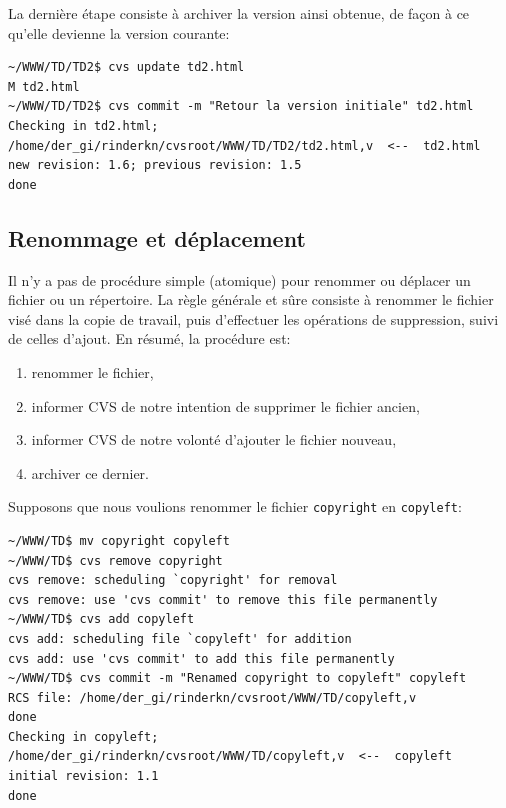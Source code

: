 \documentclass[11pt,a4paper]{article}
\begin{document}
\noindent La dernière étape consiste à archiver la version ainsi
obtenue, de façon à ce qu'elle devienne la version courante:

{\small
\begin{verbatim}
~/WWW/TD/TD2$ cvs update td2.html
M td2.html
~/WWW/TD/TD2$ cvs commit -m "Retour la version initiale" td2.html
Checking in td2.html;
/home/der_gi/rinderkn/cvsroot/WWW/TD/TD2/td2.html,v  <--  td2.html
new revision: 1.6; previous revision: 1.5
done

\end{verbatim}
}

\subsection{Renommage et déplacement}

Il n'y a pas de procédure simple (atomique) pour renommer ou déplacer
un fichier ou un répertoire. La règle générale et sûre consiste à
renommer le fichier visé dans la copie de travail, puis d'effectuer
les opérations de suppression, suivi de celles d'ajout. En résumé, la
procédure est:

\begin{enumerate}

  \item renommer le fichier,

  \item informer CVS de notre intention de supprimer le fichier
  ancien,

  \item informer CVS de notre volonté d'ajouter le fichier nouveau,

  \item archiver ce dernier.

\end{enumerate}

\noindent Supposons que nous voulions renommer le fichier
\texttt{copyright} en \texttt{copyleft}:

{\small
\begin{verbatim}
~/WWW/TD$ mv copyright copyleft
~/WWW/TD$ cvs remove copyright
cvs remove: scheduling `copyright' for removal
cvs remove: use 'cvs commit' to remove this file permanently
~/WWW/TD$ cvs add copyleft
cvs add: scheduling file `copyleft' for addition
cvs add: use 'cvs commit' to add this file permanently
~/WWW/TD$ cvs commit -m "Renamed copyright to copyleft" copyleft
RCS file: /home/der_gi/rinderkn/cvsroot/WWW/TD/copyleft,v
done
Checking in copyleft;
/home/der_gi/rinderkn/cvsroot/WWW/TD/copyleft,v  <--  copyleft
initial revision: 1.1
done
\end{verbatim}
}




\nocite{*}
\end{document}
